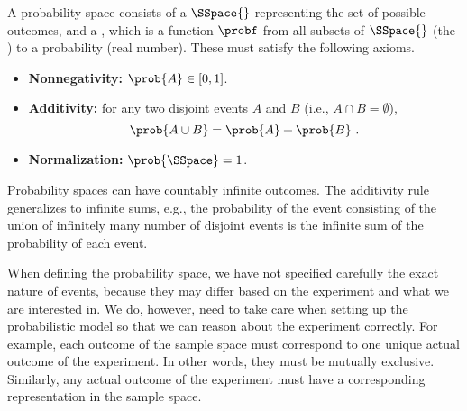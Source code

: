 \begin{flex}





\begin{definition}
\label{def:probability::spaces::probability-space}

 A probability space consists of a  $\SSpace{}$
 representing the set of possible outcomes, and a , which is a function $\probf$ from all subsets of
 $\SSpace{}$ (the ) to a probability (real number).
 These must satisfy the following axioms.

\begin{itemize}
\item \textbf{Nonnegativity:} $\prob{A} \in [0,1]$.

\item \textbf{Additivity:} for any two disjoint events $A$ and $B$
  (i.e., $A \cap B = \emptyset$), \[\prob{A \cup B} =
  \prob{A} + \prob{B}~.\]

\item \textbf{Normalization:} $\prob{\SSpace} = 1$.
\end{itemize}
\end{definition}

\begin{note}
Probability spaces can have countably infinite outcomes.  
%
The additivity rule generalizes to infinite sums, e.g., the probability of the event consisting of the union of infinitely many number of disjoint events is the infinite sum of the probability of each event. 
\end{note}

\begin{note}
When defining the probability space, we have not specified
carefully the exact nature of events, because they
may differ based on the experiment and what we are interested in.
%
We do, however, need to take care when setting up the probabilistic model so that we can  reason about the experiment correctly. 
%
For example, each outcome of the sample space must correspond to one
unique actual outcome of the experiment.  In other words, they must be
mutually exclusive. 
%
Similarly, any actual outcome of the experiment must have a
corresponding representation in the sample space.
\end{note}
\end{flex}

